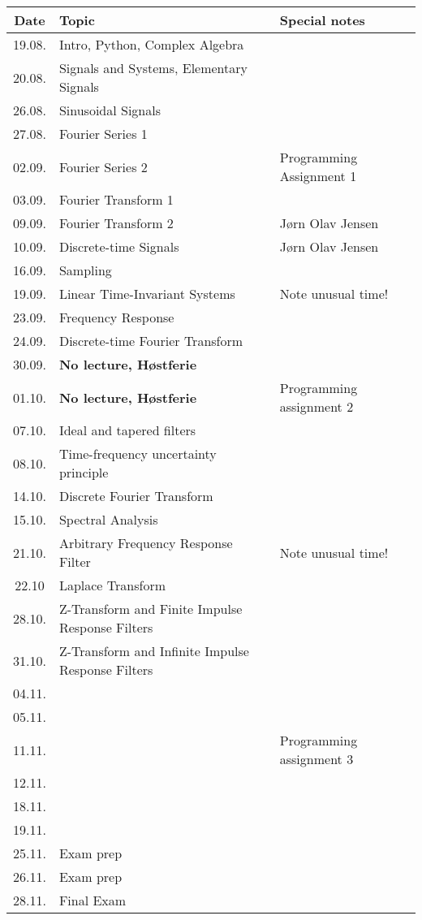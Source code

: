\begin{table}[htbp]
  \centering
  \begin{tabularx}{\textwidth}{|c|X|l|}
    \hline
    Date & Topic & Special notes \\
    \hline
    \hline    
    19.08. & Intro, Python, Complex Algebra & \\
    20.08. & Signals and Systems, Elementary Signals & \\
    26.08. & Sinusoidal Signals & \\
    27.08. & Fourier Series 1 & \\
    02.09. & Fourier Series 2 & Programming Assignment 1 \\
    03.09. & Fourier Transform 1 & \\
    09.09. & Fourier Transform 2 & Jørn Olav Jensen \\
    10.09. & Discrete-time Signals  & Jørn Olav Jensen \\
    16.09. & Sampling &  \\
    19.09. & Linear Time-Invariant Systems  & Note unusual time! \\
    23.09. & Frequency Response &  \\
    24.09. & Discrete-time Fourier Transform &  \\
    30.09. & \textbf{No lecture, Høstferie} &   \\
    01.10. & \textbf{No lecture, Høstferie} &  Programming assignment 2 \\
    07.10. & Ideal and tapered filters &    \\
    08.10. & Time-frequency uncertainty principle &    \\
    14.10. & Discrete Fourier Transform &  \\
    15.10. & Spectral Analysis &  \\
    21.10. & Arbitrary Frequency Response Filter & Note unusual time!   \\
    22.10  & Laplace Transform & \\
    28.10. & Z-Transform and Finite Impulse Response Filters  &  \\
    31.10. & Z-Transform and Infinite Impulse Response Filters &  \\
    04.11. &  &   \\
    05.11. &  &   \\                        
    11.11. &  &  Programming assignment 3   \\
    12.11. &  &   \\                        
    18.11. &  &   \\
    19.11. &  &   \\                        
    25.11. & Exam prep &   \\
    26.11. & Exam prep &   \\
    28.11. & Final Exam &   \\                            
    \hline
  \end{tabularx}
\end{table}
